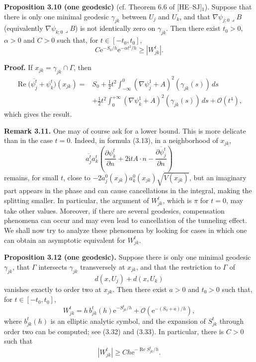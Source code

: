 \documentclass[11pt]{article}
\newcommand{\Ree}{\operatorname{Re}}
\newcommand{\OO}{\mathcal O}
\newcommand{\dd}{\,d}
\newcommand{\ii}{\mathrm{i}}
\newcommand{\e}{\mathrm{e}}
\begin{document}
\medskip
\noindent\textbf{Proposition 3.10 (one geodesic)} (cf. Theorem 6.6 of [HE--SJ]$_1$).
Suppose that there is only one minimal geodesic $\gamma_{jk}$ between $U_j$ and $U_k$, and that $\nabla\psi_{j;0}\mathbin{\lrcorner}B$ (equivalently $\nabla\psi_{k;0}\mathbin{\lrcorner}B$) is not identically zero on $\gamma_{jk}$. Then there exist $t_0>0$, $\alpha>0$ and $C>0$ such that, for $t\in[-t_0,t_0]$,
\begin{equation}
C\e^{-S_0/h}\e^{-\alpha t^2/h}\ge |W_{jk}^t|.
\tag{3.25}
\end{equation}

\noindent\textbf{Proof.}
If $x_{jk}=\gamma_{jk}\cap\Gamma$, then
\begin{align*}
\Ree\bigl(\overline{\psi_j^t}+\psi_k^t\bigr)(x_{jk})
={}&S_0+\frac12t^2\int_{-\infty}^0
(\nabla\psi_j^1+A)^2(\gamma_{jk}(s))\dd s\\
&+\frac12t^2\int_0^{+\infty}
(\nabla\psi_k^1+A)^2(\gamma_{jk}(s))\dd s
+\OO(t^4),
\end{align*}
which gives the result.

\medskip
\noindent\textbf{Remark 3.11.}
One may of course ask for a lower bound. This is more delicate than in the case $t=0$. Indeed, in formula (3.13), in a neighborhood of $x_{jk}$,
\[
\overline{a_j^t}a_k^t\left(\frac{\partial\psi_k^t}{\partial n}
+2\ii t A\cdot n-
\overline{\frac{\partial\psi_j^t}{\partial n}}\right)
\]
remains, for small $t$, close to
$-2a_j^0(x_{jk})a_k^0(x_{jk})\sqrt{V(x_{jk})}$, but an imaginary part appears in the phase and can cause cancellations in the integral, making the splitting smaller. In particular, the argument of $W_{jk}^t$, which is $\pi$ for $t=0$, may take other values. Moreover, if there are several geodesics, compensation phenomena can occur and may even lead to cancellation of the tunneling effect. We shall now try to analyze these phenomena by looking for cases in which one can obtain an asymptotic equivalent for $W_{jk}^t$.

\medskip
\noindent\textbf{Proposition 3.12 (one geodesic).}
Suppose there is only one minimal geodesic $\gamma_{jk}$, that $\Gamma$ intersects $\gamma_{jk}$ transversely at $x_{jk}$, and that the restriction to $\Gamma$ of
\[
 d(x,U_j)+d(x,U_k)
\]
vanishes exactly to order two at $x_{jk}$. Then there exist $a>0$ and $t_0>0$ such that, for $t\in[-t_0,t_0]$,
\begin{equation}
W_{jk}^t
=h\,b_{jk}^t(h)\e^{-S_{jk}^t/h}
+\OO\!\left(\e^{-(S_0+a)/h}\right),
\tag{3.26}
\end{equation}
where $b_{jk}^t(h)$ is an elliptic analytic symbol, and the expansion of $S_{jk}^t$ through order two can be computed; see (3.32) and (3.33). In particular, there is $C>0$ such that
\[
 |W_{jk}^t|\ge Ch\e^{-\Ree S_{jk}^t/h}.
\]
\end{document}

